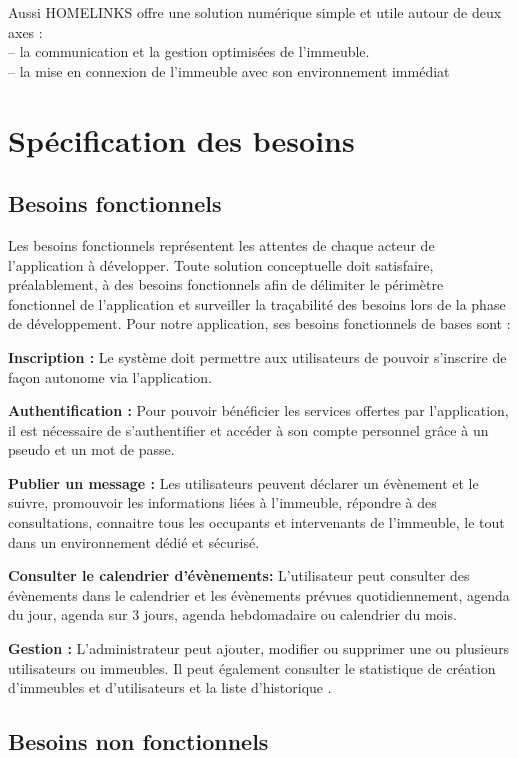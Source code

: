 \documentclass[a4paper,10pt]{book}
\begin{document}
     Aussi HOMELINKS offre une solution numérique simple et utile autour de deux axes : \\
– la communication et la gestion optimisées de l’immeuble. \\
– la mise en connexion de l’immeuble avec son environnement immédiat​

\section{Spécification des besoins  }
\subsection{ Besoins fonctionnels }
\par 
Les besoins fonctionnels représentent les attentes de chaque acteur de l’application à développer. Toute solution conceptuelle doit satisfaire, préalablement, à des besoins fonctionnels afin de délimiter le périmètre fonctionnel de l’application et surveiller la traçabilité des besoins lors de la phase de développement. Pour notre application, ses besoins fonctionnels de bases sont :
\\
\par\textbf{Inscription :} Le système doit permettre aux utilisateurs de pouvoir s’inscrire de façon autonome via l’application.
\par\textbf{Authentification :} Pour pouvoir bénéficier les services offertes par l’application, il est nécessaire de s’authentifier et accéder à son compte personnel grâce à un pseudo et un mot de passe.

\par\textbf{Publier un message :} Les utilisateurs peuvent déclarer un évènement et le suivre, promouvoir les informations liées à l’immeuble, répondre à des consultations, connaitre tous les occupants et intervenants de l’immeuble, le tout dans un environnement dédié et sécurisé.
\par\textbf{Consulter le calendrier d'évènements:} L’utilisateur peut consulter des évènements dans le calendrier et les évènements prévues quotidiennement, agenda du jour, agenda sur 3 jours, agenda hebdomadaire ou calendrier du mois.

\par\textbf{Gestion : }  L’administrateur peut ajouter, modifier ou  supprimer une ou plusieurs utilisateurs ou immeubles.  Il peut également consulter le statistique de création d'immeubles et d'utilisateurs et la liste d'historique .
\subsection{ Besoins non fonctionnels }
\end{document}
